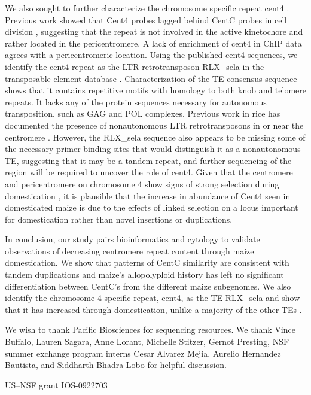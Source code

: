 {We also sought to further characterize the chromosome specific repeat cent4 \citep{Page2001}.  Previous work showed that Cent4 probes lagged behind CentC probes in cell division \citep{Jiang2002}, suggesting that the repeat is not involved in the active kinetochore and rather located in the pericentromere.  A lack of enrichment of cent4 in ChIP data agrees with a pericentromeric location.  Using the published cent4 sequences, we identify the cent4 repeat as the LTR retrotransposon RLX\_sela in the transposable element database \citep{Baucom2009}.  Characterization of the TE consensus sequence shows that it contains repetitive motifs with homology to both knob and telomere repeats.  It lacks any of the protein sequences necessary for autonomous transposition, such as GAG and POL complexes.  Previous work in rice has documented the presence of nonautonomous LTR retrotransposons  in or near the centromere \citep{Jiang2002}.  However, the RLX\_sela sequence also appears to be missing some of the necessary primer binding sites that would distinguish it as a nonautonomous TE, suggesting that it may be a tandem repeat, and further sequencing of the region will be required to uncover the role of cent4.   Given that the centromere and pericentromere on chromosome 4 show signs of strong selection during domestication \citep{Hufford2012}, it is plausible that the increase in abundance of Cent4 seen in domesticated maize is due to the effects of linked selection on a locus important for domestication rather than novel insertions or duplications. 

In conclusion, our study pairs bioinformatics and cytology to validate observations of decreasing centromere repeat content through maize domestication.  We show that patterns of CentC similarity are consistent with tandem duplications and maize’s allopolyploid history has left no significant differentiation between CentC’s from the different maize subgenomes. We also identify the chromosome 4 specific repeat, cent4, as the TE RLX\_sela and show that it has increased through domestication, unlike a majority of the other TEs \citep{Chia2012}.    

\begin{acknowledgements}
We wish to thank Pacific Biosciences for sequencing resources.  We thank Vince Buffalo, Lauren Sagara, Anne Lorant, Michelle Stitzer, Gernot Presting,  NSF summer exchange program interns Cesar Alvarez Mejia, Aurelio Hernandez Bautista, and Siddharth Bhadra-Lobo for helpful discussion.


US–NSF grant IOS-0922703


\end{acknowledgements}}
